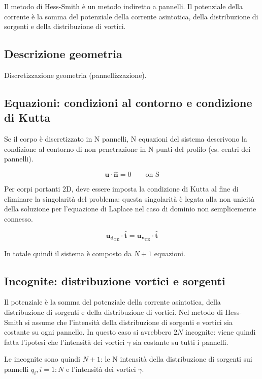 Il metodo di Hess-Smith è un metodo indiretto a pannelli.
Il potenziale della corrente è la somma del potenziale della corrente asintotica, della distribuzione di
sorgenti e della distribuzione di vortici. 

\subsection{Descrizione geometria}

Discretizzazione geometria (pannellizzazione).

\subsection{Equazioni: condizioni al contorno e condizione di Kutta}

Se il corpo è discretizzato in N pannelli, N equazioni del sistema descrivono la condizione 
al contorno di non penetrazione in N punti del profilo (es. centri dei pannelli).

\begin{equation}
 \bm{u} \cdot \bm{\hat{n}} = 0 \qquad \text{on S}
\end{equation}

Per corpi portanti 2D, deve essere imposta la condizione di Kutta al fine di eliminare la singolarità del problema:
questa singolarità è legata alla non unicità della soluzione per l'equazione di Laplace nel caso di dominio non
semplicemente connesso.

\begin{equation}
 \bm{u_{d_{TE}}} \cdot \bm{\hat{t}} = \bm{u_{v_{TE}}} \cdot \bm{\hat{t}}
\end{equation}

In totale quindi il sistema è composto da $N+1$ equazioni.

\subsection{Incognite: distribuzione vortici e sorgenti}

Il potenziale è la somma del potenziale della corrente asintotica, della distribuzione di
sorgenti e della distribuzione di vortici. Nel metodo di Hess-Smith si assume che l'intensità della
distribuzione di sorgenti e vortici sia costante su ogni pannello. In questo caso si avrebbero $2N$ incognite:
viene quindi fatta l'ipotesi che l'intensità dei vortici $\gamma$ sia costante su tutti i pannelli.

Le incognite sono quindi $N+1$: le N intensità della distribuzione di sorgenti sui pannelli $q_i, i=1:N$ e 
l'intensità dei vortici $\gamma$.

